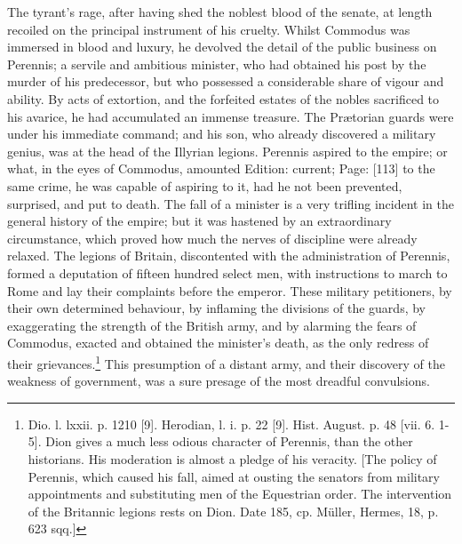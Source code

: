 The tyrant\texthebrew{}’s rage, after having shed the noblest blood of the senate, at length recoiled on the principal instrument of his cruelty. Whilst Commodus was immersed in blood and luxury, he devolved the detail of the public business on Perennis; a servile and ambitious minister, who had obtained his post by the murder of his predecessor, but who possessed a considerable share of vigour and ability. By acts of extortion, and the forfeited estates of the nobles sacrificed to his avarice, he had accumulated an immense treasure. The Prætorian guards were under his immediate command; and his son, who already discovered a military genius, was at the head of the Illyrian legions. Perennis aspired to the empire; or what, in the eyes of Commodus, amounted Edition: current; Page: [113] to the same crime, he was capable of aspiring to it, had he not been prevented, surprised, and put to death. The fall of a minister is a very trifling incident in the general history of the empire; but it was hastened by an extraordinary circumstance, which proved how much the nerves of discipline were already relaxed. The legions of Britain, discontented with the administration of Perennis, formed a deputation of fifteen hundred select men, with instructions to march to Rome and lay their complaints before the emperor. These military petitioners, by their own determined behaviour, by inflaming the divisions of the guards, by exaggerating the strength of the British army, and by alarming the fears of Commodus, exacted and obtained the minister\texthebrew{}’s death, as the only redress of their grievances.\footnote{Dio. l. lxxii. p. 1210 [9]. Herodian, l. i. p. 22 [9]. Hist. August. p. 48 [vii. 6. 1-5]. Dion gives a much less odious character of Perennis, than the other historians. His moderation is almost a pledge of his veracity. [The policy of Perennis, which caused his fall, aimed at ousting the senators from military appointments and substituting men of the Equestrian order. The intervention of the Britannic legions rests on Dion. Date 185, cp. Müller, Hermes, 18, p. 623 sqq.]} This presumption of a distant army, and their discovery of the weakness of government, was a sure presage of the most dreadful convulsions.


